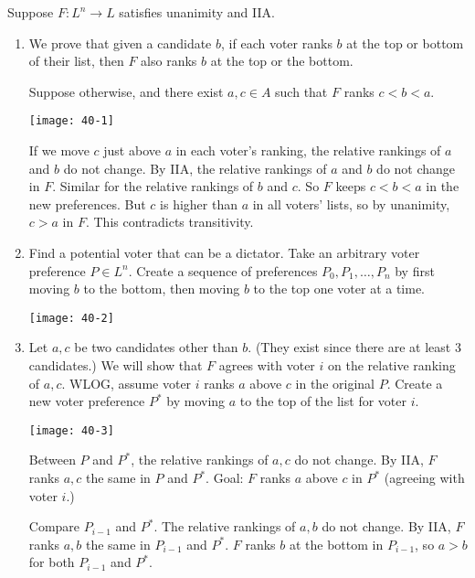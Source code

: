 \documentclass[12pt,letterpaper]{report}
\begin{document}
\begin{thmproof}
  Suppose $F \colon L^n \to L$ satisfies unanimity and IIA.
  \begin{enumerate}
    \item
    We prove that given a candidate $b$, if each voter ranks $b$ at the top or bottom of their list,
    then $F$ also ranks $b$ at the top or the bottom.

    Suppose otherwise, and there exist $a, c \in A$ such that $F$ ranks $c < b < a$.
    \begin{center}
      \texttt{[image: 40-1]}
    \end{center}
    If we move $c$ just above $a$ in each voter's ranking, the relative rankings of $a$ and $b$ do
    not change.
    By IIA, the relative rankings of $a$ and $b$ do not change in $F$.
    Similar for the relative rankings of $b$ and $c$.
    So $F$ keeps $c < b < a$ in the new preferences.
    But $c$ is higher than $a$ in all voters' lists, so by unanimity, $c > a$ in $F$.
    This contradicts transitivity.

    \item
    Find a potential voter that can be a dictator.
    Take an arbitrary voter preference $P \in L^n$.
    Create a sequence of preferences $P_0, P_1, \ldots, P_n$ by first moving $b$ to the bottom, then
    moving $b$ to the top one voter at a time.
    \begin{center}
      \texttt{[image: 40-2]}
    \end{center}

    \item
    Let $a, c$ be two candidates other than $b$.
    (They exist since there are at least 3 candidates.)
    We will show that $F$ agrees with voter $i$ on the relative ranking of $a, c$.
    WLOG, assume voter $i$ ranks $a$ above $c$ in the original $P$.
    Create a new voter preference $P^*$ by moving $a$ to the top of the list for voter $i$.
    \begin{center}
      \texttt{[image: 40-3]}
    \end{center}
    Between $P$ and $P^*$, the relative rankings of $a, c$ do not change.
    By IIA, $F$ ranks $a, c$ the same in $P$ and $P^*$.
    Goal: $F$ ranks $a$ above $c$ in $P^*$ (agreeing with voter $i$.)

    Compare $P_{i - 1}$ and $P^*$.
    The relative rankings of $a, b$ do not change.
    By IIA, $F$ ranks $a, b$ the same in $P_{i - 1}$ and $P^*$.
    $F$ ranks $b$ at the bottom in $P_{i - 1}$, so $a > b$ for both $P_{i - 1}$ and $P^*$.


\end{enumerate}
\end{thmproof}
\end{document}

